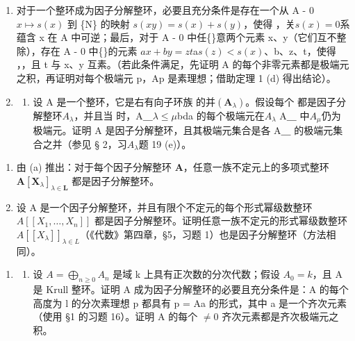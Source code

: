 
\begin{enumerate}
\def\labelenumi{\arabic{enumi}.}
\item
  对于一个整环成为因子分解整环，必要且充分条件是存在一个从 A - 0\(x \mapsto s(x)\) 到 \{N\} 的映射 \(s(xy) = s(x) + s(y)\)，使得 ，关\(s(x) = 0\)系  蕴含 x 在 A 中可逆；最后，对于 A - 0 中任\{\}意两个元素 x、y（它们互不整除），存在 A - 0 中\{\}的元素 \(ax + by = zt\)a\(s(z) < s(x)\)、b、z、t，使得 ，，且 t 与 x、y 互素。（若此条件满足，先证明 A 的每个非零元素都是极端元之积，再证明对每个极端元 p，Ap 是素理想；借助定理 1 (d) 得出结论）。
\item
  \begin{enumerate}
  \def\labelenumii{(\alph{enumii})}
  \tightlist
  \item
    设 A 是一个整环，它是右有向子环族  的并\((\mathbf{A}_{\lambda})\)。假设每个  都是因子分解整环\(A_{\lambda}\)，并且当  时，A＿\(\lambda \leqslant \mu\)bda 的每个极端元在\(A_{\lambda}\) A＿ 中\(A_{\mu}\)仍为极端元。证明 A 是因子分解整环，且其极端元集合是各 A＿ 的极端元集合之并（参见 § 2，习\(A_{\lambda}\)题 19 (e)）。
  \end{enumerate}
\end{enumerate}

\begin{enumerate}
\def\labelenumi{(\alph{enumi})}
\setcounter{enumi}{1}
\item
  由 (a) 推出：对于每个因子分解整环 \(\mathbf{A}\)，任意一族不定元上的多项式整环 \(\mathbf{A}[\mathbf{X}_{\lambda}]_{\lambda \in \mathbf{L}}\) 都是因子分解整环。
\item
  设 A 是一个因子分解整环，并且有限个不定元的每个形式幂级数整环 \(A[[X_{1},\ldots,X_{n}]]\) 都是因子分解整环。证明任意一族不定元的形式幂级数整环 \(A[[X_{\lambda}]]_{\lambda\in L}\)（《代数》第四章，§5，习题 1）也是因子分解整环（方法相同）。
\end{enumerate}

\begin{enumerate}
\def\labelenumi{\arabic{enumi}.}
\setcounter{enumi}{2}
\tightlist
\item
  \begin{enumerate}
  \def\labelenumii{(\alph{enumii})}
  \tightlist
  \item
    设 \(A = \bigoplus_{n \geqslant 0} A_n\) 是域 k 上具有正次数的分次代数；假设 \(A_0 = k\)，且 A 是 Krull 整环。证明 A 成为因子分解整环的必要且充分条件是：A 的每个高度为 l 的分次素理想 p 都具有 p = Aa 的形式，其中 a 是一个齐次元素（使用 §1 的习题 16）。证明 A 的每个 \(\neq 0\) 齐次元素都是齐次极端元之积。
  \end{enumerate}
\end{enumerate}

